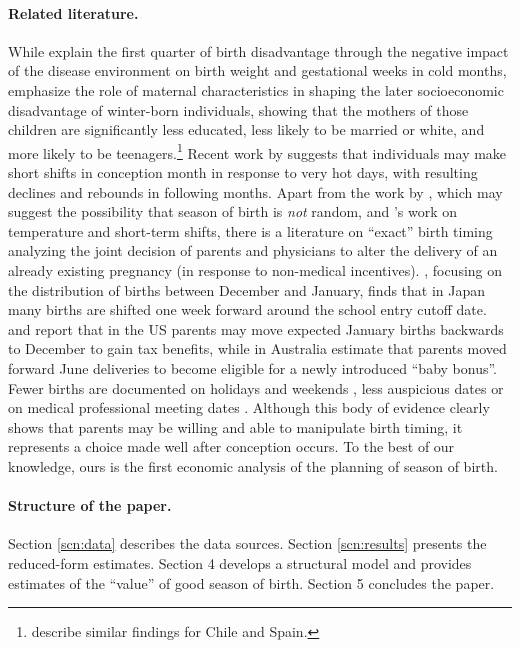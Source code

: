 \documentclass[a4paper, 12 pt]{article}
\theoremstyle{plain}
\begin{document}
\begin{doublespace}
\paragraph{Related literature.} While \citet{CS2013} explain the first quarter of birth disadvantage through the negative impact of the disease environment on birth weight and gestational weeks in cold months, \citet{BucklesHungerman2013} emphasize the role of maternal characteristics in shaping the later socioeconomic disadvantage of winter-born individuals, showing that the mothers of those children are significantly less educated, less likely to be married or white, and more likely to be teenagers.\footnote{\citet{AlbaCaceres2014} describe similar findings for Chile and Spain.} Recent work by \citet{Barrecaetal2015} suggests that individuals may make short shifts in conception month in response to very hot days, with resulting declines and rebounds in following months.  Apart from the work by \citet{BucklesHungerman2013}, which may suggest the possibility that season of birth is \emph{not} random, and \citet{Barrecaetal2015}'s work on temperature and short-term shifts, there is a literature on ``exact'' birth timing analyzing the joint decision of parents and physicians to alter the delivery of an already existing pregnancy (in response to non-medical incentives). \citet{Shigeoka2015}, focusing on the distribution of births between December and January,  finds that in Japan many births are shifted one week forward around the school entry cutoff date. \citet{DCChandra1999} and \citet{LaLumiaetal2015} report that in the US parents may move expected January births backwards to December to gain tax benefits, while in Australia \citet{GansLeigh2009} estimate that parents moved forward June deliveries to become eligible for a newly introduced ``baby bonus''. Fewer births are documented on holidays \citep{Rindfuss1979} and weekends \citep{Gould2003}, less auspicious dates \citep{Almond15} or on medical professional meeting dates \citep{GLV2007}. Although this body of evidence clearly shows that parents may be willing and able to manipulate birth timing, it represents a choice made well after conception occurs. To the best of our knowledge, ours is the first economic analysis of the planning of season of birth.

\paragraph{Structure of the paper.} Section \ref{scn:data} describes the data sources. Section \ref{scn:results} presents the reduced-form estimates. Section 4 develops a structural model and provides estimates of the ``value'' of good season of birth. Section 5 concludes the paper.


\end{doublespace}
\end{document}
